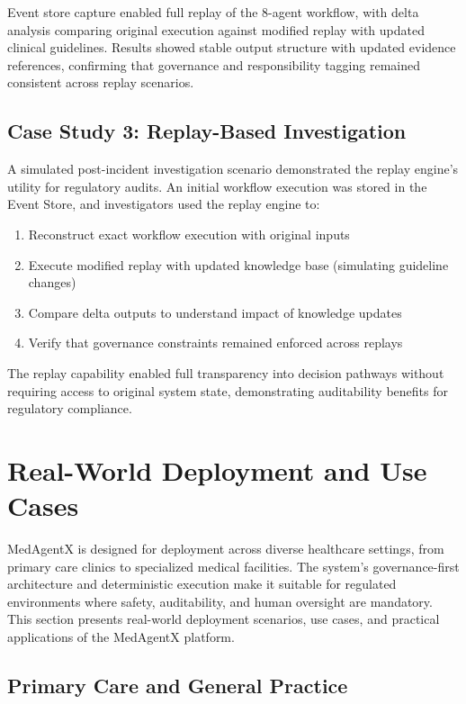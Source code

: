 \documentclass[journal]{IEEEtran}
\begin{document}
Event store capture enabled full replay of the 8-agent workflow, with delta analysis comparing original execution against modified replay with updated clinical guidelines. Results showed stable output structure with updated evidence references, confirming that governance and responsibility tagging remained consistent across replay scenarios.

\subsection{Case Study 3: Replay-Based Investigation}
A simulated post-incident investigation scenario demonstrated the replay engine's utility for regulatory audits. An initial workflow execution was stored in the Event Store, and investigators used the replay engine to:

\begin{enumerate}
    \item Reconstruct exact workflow execution with original inputs
    \item Execute modified replay with updated knowledge base (simulating guideline changes)
    \item Compare delta outputs to understand impact of knowledge updates
    \item Verify that governance constraints remained enforced across replays
\end{enumerate}

The replay capability enabled full transparency into decision pathways without requiring access to original system state, demonstrating auditability benefits for regulatory compliance.

\newpage
\section{Real-World Deployment and Use Cases}

MedAgentX is designed for deployment across diverse healthcare settings, from primary care clinics to specialized medical facilities. The system's governance-first architecture and deterministic execution make it suitable for regulated environments where safety, auditability, and human oversight are mandatory. This section presents real-world deployment scenarios, use cases, and practical applications of the MedAgentX platform.

\subsection{Primary Care and General Practice}
\end{document}
